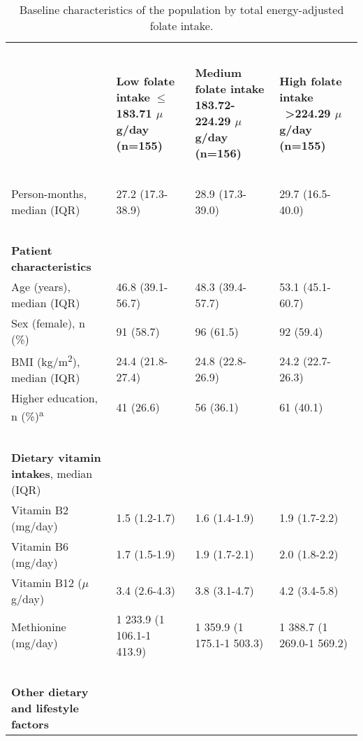 \begin{table}
\caption{Baseline characteristics of the population by total energy-adjusted folate intake.}
\label{table6_1}
\begin{adjustbox}{width=\textwidth}
\begin{tabular}{L{4.8cm}C{3.5cm}C{3.5cm}C{3.5cm}}

\hline

~ & ~ & ~ & ~\\
~ & {\bfseries Low folate intake} {\bfseries ${\leq}$183.71 $\mu$g/day} \bfseries (n=155) & {\bfseries Medium folate intake} \bfseries 183.72-224.29 $\mu$g/day (n=156) & {\bfseries High folate intake} \ {\bfseries {\textgreater}224.29 $\mu$g/day} \bfseries (n=155)\\
~ & ~ & ~ & ~\\
\hline


Person-months, median (IQR) & 27.2 (17.3-38.9) & 28.9 (17.3-39.0) & 29.7 (16.5-40.0)\\
~ & ~ & ~ & ~\\
\bfseries Patient characteristics & ~ & ~ & ~ \\

{Age (years), median (IQR)} & 46.8 (39.1-56.7) & 48.3 (39.4-57.7) & 53.1 (45.1-60.7)\\
 Sex (female), n (\%) & 91 (58.7) & 96 (61.5) & 92 (59.4)\\
 {BMI (kg/m}{\textsuperscript{2}}{), median (IQR)} & 24.4 (21.8-27.4) & 24.8 (22.8-26.9) & 24.2 (22.7-26.3)\\
{Higher education, n (\%)}\textsuperscript{a} & 41 (26.6) & 56 (36.1) & 61 (40.1)\\

~ & ~ & ~ & ~\\
{\textbf{Dietary vitamin intakes}}{, median (IQR)} & ~ & ~ & ~ \\
 Vitamin B2 (mg/day) & 1.5 (1.2-1.7) & 1.6 (1.4-1.9) & 1.9 (1.7-2.2)\\
 Vitamin B6 (mg/day) & 1.7 (1.5-1.9) & 1.9 (1.7-2.1) & 2.0 (1.8-2.2)\\
 Vitamin B12 ($\mu$g/day) & 3.4 (2.6-4.3) & 3.8 (3.1-4.7) & 4.2 (3.4-5.8)\\
 Methionine (mg/day) & 1 233.9 (1 106.1-1 413.9) & 1 359.9 (1 175.1-1 503.3) & 1 388.7 (1 269.0-1 569.2)\\
~ & ~ & ~ & ~\\

\bfseries Other dietary and lifestyle factors & ~ & ~ & ~ \\


\end{tabular}
\end{adjustbox}
\end{table}
